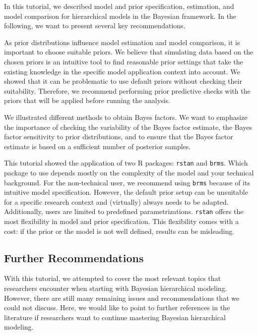 \documentclass[
  english,
  doc,floatsintext]{apa6}
\begin{document}
In this tutorial, we described model and prior specification, estimation, and model comparison for hierarchical models in the Bayesian framework. In the following, we want to present several key recommendations.

As prior distributions influence model estimation and model comparison, it is important to choose suitable priors. We believe that simulating data based on the chosen priors is an intuitive tool to find reasonable prior settings that take the existing knowledge in the specific model application context into account. We showed that it can be problematic to use default priors without checking their suitability. Therefore, we recommend performing prior predictive checks with the priors that will be applied before running the analysis.

We illustrated different methods to obtain Bayes factors. We want to emphasize the importance of checking the variability of the Bayes factor estimate, the Bayes factor sensitivity to prior distributions, and to ensure that the Bayes factor estimate is based on a sufficient number of posterior samples.

This tutorial showed the application of two R packages: \texttt{rstan} and \texttt{brms}. Which package to use depends mostly on the complexity of the model and your technical background. For the non-technical user, we recommend using \texttt{brms} because of its intuitive model specification. However, the default prior setup can be unsuitable for a specific research context and (virtually) always needs to be adapted. Additionally, users are limited to predefined parametrizations. \texttt{rstan} offers the most flexibility in model and prior specification. This flexibility comes with a cost: if the prior or the model is not well defined, results can be misleading.

\hypertarget{further-recommendations}{%
\subsection{Further Recommendations}\label{further-recommendations}}

With this tutorial, we attempted to cover the most relevant topics that researchers encounter when starting with Bayesian hierarchical modeling. However, there are still many remaining issues and recommendations that we could not discuss. Here, we would like to point to further references in the literature if researchers want to continue mastering Bayesian hierarchical modeling.
\end{document}
